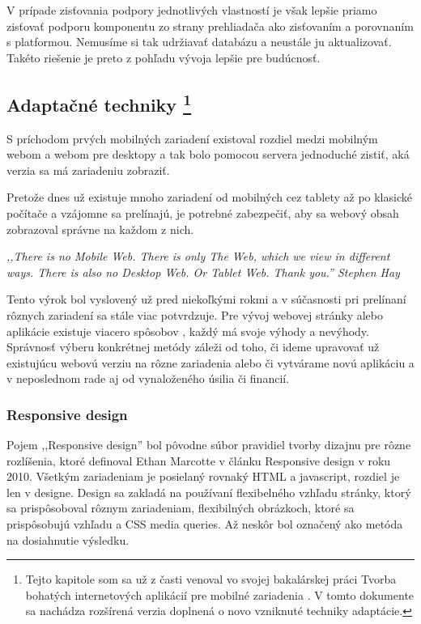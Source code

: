 V prípade zisťovania podpory jednotlivých vlastností je však lepšie priamo zisťovať podporu komponentu zo strany prehliadača ako zisťovaním a porovnaním s platformou. Nemusíme si tak udržiavať databázu a neustále ju aktualizovať. Takéto riešenie je preto z pohľadu vývoja lepšie pre budúcnosť.




\subsection{Adaptačné techniky \footnote{Tejto kapitole som sa už z časti venoval vo svojej bakalárskej práci Tvorba bohatých internetových aplikácií pre mobilné zariadenia \cite{ja}. V tomto dokumente sa nachádza rozšírená verzia doplnená o novo vzniknuté techniky adaptácie.}} %
\label{sub:adapta_n_techniky}

S príchodom prvých mobilných zariadení existoval rozdiel medzi mobilným webom a webom pre desktopy a tak bolo pomocou servera jednoduché zistiť, aká verzia sa má zariadeniu zobraziť.

Pretože dnes už existuje mnoho zariadení od mobilných cez tablety až po klasické počítače a vzájomne sa prelínajú, je potrebné zabezpečiť, aby sa webový obsah zobrazoval správne na každom z nich.

\begin{fancybox}
\textit{,,There is no Mobile Web. There is only The Web, which we view in different ways. There is also no Desktop Web. Or Tablet Web. Thank you.'' Stephen Hay} \cite{noMobileWeb}
\end{fancybox}

Tento výrok bol vyslovený už pred niekoľkými rokmi a v súčasnosti pri prelínaní rôznych zariadení sa stále viac potvrdzuje. Pre vývoj webovej stránky alebo aplikácie existuje viacero spôsobov \cite{mobiforge}, každý má svoje výhody a nevýhody. Správnosť výberu konkrétnej metódy záleži od toho, či ideme upravovať už existujúcu webovú verziu na rôzne zariadenia alebo či vytvárame novú aplikáciu a v neposlednom rade aj od vynaloženého úsilia či financií.


\subsubsection{Responsive design} %
\label{ssub:responsive_design}

Pojem ,,Responsive design'' bol pôvodne súbor pravidiel tvorby dizajnu pre rôzne rozlíšenia, ktoré definoval Ethan Marcotte v článku Responsive design v roku 2010. Všetkým zariadeniam je posielaný rovnaký HTML a javascript, rozdiel je len v designe. Design sa zakladá na používaní flexibelného vzhľadu stránky, ktorý sa prispôsoboval rôznym zariadeniam, flexibilných obrázkoch, ktoré sa prispôsobujú vzhľadu a CSS media queries. \cite{responsive, mediaqueries} Až neskôr bol označený ako metóda na dosiahnutie výsledku.

